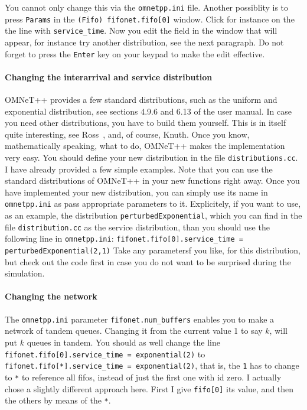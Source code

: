 \documentclass[a4paper]{article}
\begin{document}
You cannot only change this via the \texttt{omnetpp.ini} file. Another
possiblity is to press \texttt{Params} in the \texttt{(Fifo)
  fifonet.fifo[0]} window. Click for instance on the the line with
\texttt{service\_time}. Now you edit the field in the window that will
appear, for instance try another distribution, see the next paragraph.
Do not forget to press the \texttt{Enter} key on your keypad to make
the edit effective.

\paragraph{Changing the interarrival and service distribution}
\label{sec:chang-inter-serv-1}
OMNeT++ provides a few standard distributions, such as the uniform and
exponential distribution, see sections 4.9.6 and 6.13 of the user
manual. In case you need other distributions, you have to build them
yourself. This is in itself quite interesting, see Ross~\cite{Ross93},
and, of course, Knuth\cite{Knuth97}. Once you know, mathematically
speaking, what to do, OMNeT++ makes the implementation very easy.  You
should define your new distribution in the file
\texttt{distributions.cc}. I have already provided a few simple
examples.  Note that you can use the standard distributions of OMNeT++
in your new functions right away. Once you have implemented your new
distribution, you can simply use its name in \texttt{omnetpp.ini} as
pass appropriate parameters to it. Explicitely, if you want to use, as
an example, the distribution \texttt{perturbedExponential}, which you
can find in the file \texttt{distribution.cc} as
the service distribution, than you should use the following line in
\texttt{omnetpp.ini}:
\texttt{fifonet.fifo[0].service\_time = perturbedExponential(2,1)}
Take any parametersf you like, for this distribution, but check out
the code first in case you do not want to be surprised during the
simulation. 

\paragraph{Changing the network}
\label{sec:changing-network}
The \texttt{omnetpp.ini} parameter \texttt{fifonet.num\_buffers}
enables you to make a network of tandem queues. Changing it from the
current value 1 to say $k$, will put $k$ queues in tandem. You should
as well change the line
 \texttt{fifonet.fifo[0].service\_time = exponential(2)}  to 
\texttt{fifonet.fifo[*].service\_time = exponential(2)}, that is, the
\texttt{1} has to  change to \texttt{*} to reference all fifos, instead of
just the first one with id zero. I actually chose a slightly different
approach here. First I give \texttt{fifo[0]} its value, and then the
others by means of the \texttt{*}. 
\end{document}
